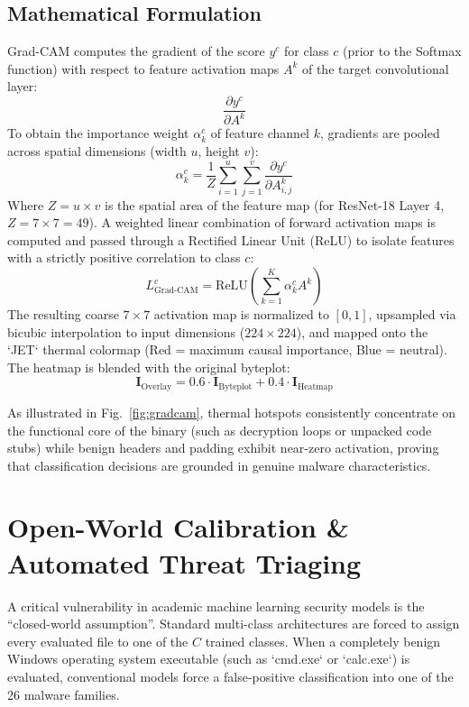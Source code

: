 \documentclass[journal,10pt,twocolumn]{IEEEtran}
\begin{document}
\subsection{Mathematical Formulation}
Grad-CAM computes the gradient of the score $y^c$ for class $c$ (prior to the Softmax function) with respect to feature activation maps $A^k$ of the target convolutional layer:
\begin{equation}
\frac{\partial y^c}{\partial A^k}
\end{equation}
To obtain the importance weight $\alpha_k^c$ of feature channel $k$, gradients are pooled across spatial dimensions (width $u$, height $v$):
\begin{equation}
\alpha_k^c = \frac{1}{Z} \sum_{i=1}^u \sum_{j=1}^v \frac{\partial y^c}{\partial A_{i, j}^k}
\end{equation}
Where $Z = u \times v$ is the spatial area of the feature map (for ResNet-18 Layer 4, $Z = 7 \times 7 = 49$). A weighted linear combination of forward activation maps is computed and passed through a Rectified Linear Unit (ReLU) to isolate features with a strictly positive correlation to class $c$:
\begin{equation}
L_{\text{Grad-CAM}}^c = \text{ReLU}\left( \sum_{k=1}^K \alpha_k^c A^k \right)
\end{equation}
The resulting coarse $7 \times 7$ activation map is normalized to $[0, 1]$, upsampled via bicubic interpolation to input dimensions ($224 \times 224$), and mapped onto the `JET` thermal colormap (Red = maximum causal importance, Blue = neutral). The heatmap is blended with the original byteplot:
\begin{equation}
\mathbf{I}_{\text{Overlay}} = 0.6 \cdot \mathbf{I}_{\text{Byteplot}} + 0.4 \cdot \mathbf{I}_{\text{Heatmap}}
\end{equation}

As illustrated in Fig.~\ref{fig:gradcam}, thermal hotspots consistently concentrate on the functional core of the binary (such as decryption loops or unpacked code stubs) while benign headers and padding exhibit near-zero activation, proving that classification decisions are grounded in genuine malware characteristics.

\section{Open-World Calibration \& Automated Threat Triaging}
A critical vulnerability in academic machine learning security models is the ``closed-world assumption''. Standard multi-class architectures are forced to assign every evaluated file to one of the $C$ trained classes. When a completely benign Windows operating system executable (such as `cmd.exe` or `calc.exe`) is evaluated, conventional models force a false-positive classification into one of the 26 malware families.
\end{document}
